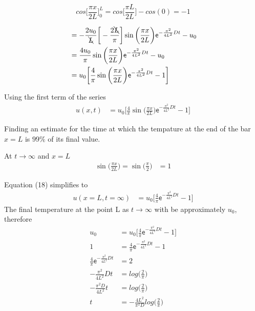 \documentclass[a4paper]{article}
\newenvironment{aside}
  {\begin{mdframed}[style=0,%
      leftline=false,rightline=false,leftmargin=2em,rightmargin=2em,%
          innerleftmargin=0pt,innerrightmargin=0pt,linewidth=0.5pt,%
      skipabove=7pt,skipbelow=7pt]\footnotesize}
  {\end{mdframed}}
\begin{document}
\begin{aside}
 \begin{equation*}
    cos\bigg[\frac{\pi x}{2L}\bigg]_{0}^{L}  = cos\bigg[\frac{\pi L}{2L}\bigg] - cos(0) =  - 1 
 \end{equation*}
\end{aside}

\begin{align*}
  	 &=  -\frac{2u_{0}}{\bcancel{L}} \bigg[ -\frac{2\bcancel{L}}{\pi} \bigg] \sin \bigg(\frac{ \pi x}{2L} \bigg) \mathsf{e}^{-\frac{\pi^{2}}{4L^{2}} D t} -u_{0}  \\
  	 &=  \frac{4u_{0}}{\pi} \sin \bigg(\frac{ \pi x}{2L} \bigg) \mathsf{e}^{-\frac{\pi^{2}}{4L^{2}} D t} -u_{0}   \\
 	 &=  u_{0} \bigg[ \frac{4}{\pi} \sin \bigg(\frac{ \pi x}{2L} \bigg) \mathsf{e}^{-\frac{\pi^{2}}{4L^{2}} D t} - 1 \bigg]
\end{align*}

Using the first term of the series 
\begin{align}
  u(x,t) &=  u_{0} \bigg[ \frac{4}{\pi} \sin \bigg(\frac{ \pi x}{2L} \bigg) \mathsf{e}^{-\frac{\pi^{2}}{4L^{2}} D t} - 1 \bigg]
\end{align}

Finding an estimate for the time at which the tempature at the end of the bar $x = L$ is $99\%$ of its final value.
\begin{aside}
 At $t \rightarrow \infty$ and $x = L$
 \begin{align*}
     \sin \bigg(\frac{ \pi x}{2L} \bigg) = \sin \bigg(\frac{ \pi }{2} \bigg) &= 1
 \end{align*}
\end{aside}

Equation (18) simplifies to 
\begin{align} 
  u(x = L,t = \infty) &=  u_{0} \bigg[ \frac{4}{\pi}\mathsf{e}^{-\frac{\pi^{2}}{4L^{2}} D t} - 1 \bigg]
\end{align}
The final temperature at the point L as $t \rightarrow \infty$ with be approximately $u_{0}$, therefore
\begin{align*} 
  u_{0} &=  u_{0} \bigg[ \frac{4}{\pi}\mathsf{e}^{-\frac{\pi^{2}}{4L^{2}} D t} - 1 \bigg] \\
  1 &=  \frac{4}{\pi}\mathsf{e}^{-\frac{\pi^{2}}{4L^{2}} D t} - 1  \\
  \frac{4}{\pi}\mathsf{e}^{-\frac{\pi^{2}}{4L^{2}} D t} &= 2  \\
  -\frac{\pi^{2}}{4L^{2}} D t &= log \bigg(\frac{2}{\pi} \bigg)  \\
  -\frac{\pi^{2}D}{4L^{2}} t &= log \bigg(\frac{2}{\pi} \bigg)  \\
  t &= -\frac{4L^{2}}{\pi^{2}D}log \bigg(\frac{2}{\pi} \bigg)
\end{align*}
\end{document}
